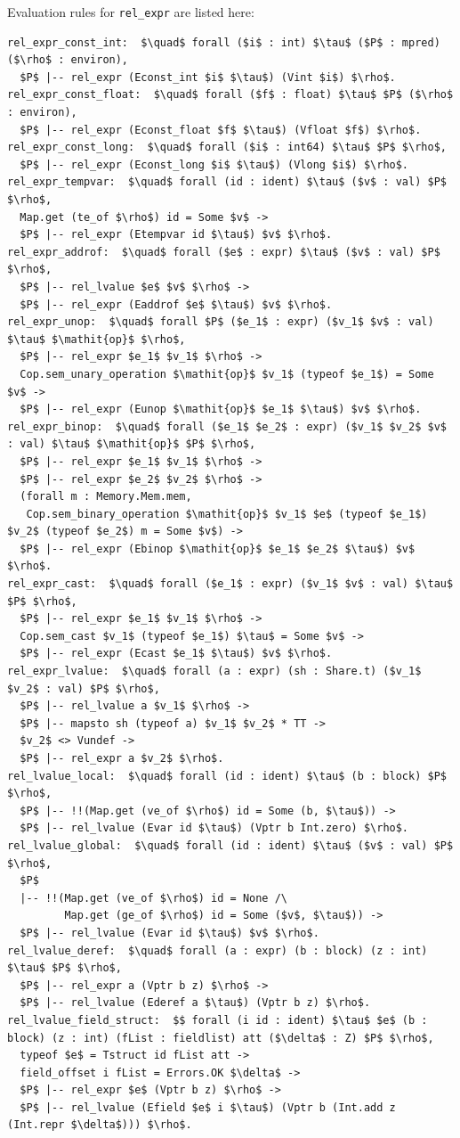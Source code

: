 \documentclass[12pt,fleqn,openany,oneside,showtrims]{memoir}
\begin{document}
Evaluation rules for \lstinline{rel_expr} are listed here:
\begin{lstlisting}
rel_expr_const_int:  $\quad$ forall ($i$ : int) $\tau$ ($P$ : mpred) ($\rho$ : environ),
  $P$ |-- rel_expr (Econst_int $i$ $\tau$) (Vint $i$) $\rho$.
rel_expr_const_float:  $\quad$ forall ($f$ : float) $\tau$ $P$ ($\rho$ : environ),
  $P$ |-- rel_expr (Econst_float $f$ $\tau$) (Vfloat $f$) $\rho$.
rel_expr_const_long:  $\quad$ forall ($i$ : int64) $\tau$ $P$ $\rho$,
  $P$ |-- rel_expr (Econst_long $i$ $\tau$) (Vlong $i$) $\rho$.
rel_expr_tempvar:  $\quad$ forall (id : ident) $\tau$ ($v$ : val) $P$ $\rho$,
  Map.get (te_of $\rho$) id = Some $v$ ->
  $P$ |-- rel_expr (Etempvar id $\tau$) $v$ $\rho$.
rel_expr_addrof:  $\quad$ forall ($e$ : expr) $\tau$ ($v$ : val) $P$ $\rho$,
  $P$ |-- rel_lvalue $e$ $v$ $\rho$ ->
  $P$ |-- rel_expr (Eaddrof $e$ $\tau$) $v$ $\rho$.
rel_expr_unop:  $\quad$ forall $P$ ($e_1$ : expr) ($v_1$ $v$ : val) $\tau$ $\mathit{op}$ $\rho$,
  $P$ |-- rel_expr $e_1$ $v_1$ $\rho$ ->
  Cop.sem_unary_operation $\mathit{op}$ $v_1$ (typeof $e_1$) = Some $v$ ->
  $P$ |-- rel_expr (Eunop $\mathit{op}$ $e_1$ $\tau$) $v$ $\rho$.
rel_expr_binop:  $\quad$ forall ($e_1$ $e_2$ : expr) ($v_1$ $v_2$ $v$ : val) $\tau$ $\mathit{op}$ $P$ $\rho$,
  $P$ |-- rel_expr $e_1$ $v_1$ $\rho$ ->
  $P$ |-- rel_expr $e_2$ $v_2$ $\rho$ ->
  (forall m : Memory.Mem.mem,
   Cop.sem_binary_operation $\mathit{op}$ $v_1$ $e$ (typeof $e_1$) $v_2$ (typeof $e_2$) m = Some $v$) ->
  $P$ |-- rel_expr (Ebinop $\mathit{op}$ $e_1$ $e_2$ $\tau$) $v$ $\rho$.
rel_expr_cast:  $\quad$ forall ($e_1$ : expr) ($v_1$ $v$ : val) $\tau$ $P$ $\rho$,
  $P$ |-- rel_expr $e_1$ $v_1$ $\rho$ ->
  Cop.sem_cast $v_1$ (typeof $e_1$) $\tau$ = Some $v$ ->
  $P$ |-- rel_expr (Ecast $e_1$ $\tau$) $v$ $\rho$.
rel_expr_lvalue:  $\quad$ forall (a : expr) (sh : Share.t) ($v_1$ $v_2$ : val) $P$ $\rho$,
  $P$ |-- rel_lvalue a $v_1$ $\rho$ ->
  $P$ |-- mapsto sh (typeof a) $v_1$ $v_2$ * TT ->
  $v_2$ <> Vundef ->
  $P$ |-- rel_expr a $v_2$ $\rho$.
rel_lvalue_local:  $\quad$ forall (id : ident) $\tau$ (b : block) $P$ $\rho$,
  $P$ |-- !!(Map.get (ve_of $\rho$) id = Some (b, $\tau$)) ->
  $P$ |-- rel_lvalue (Evar id $\tau$) (Vptr b Int.zero) $\rho$.
rel_lvalue_global:  $\quad$ forall (id : ident) $\tau$ ($v$ : val) $P$ $\rho$,
  $P$
  |-- !!(Map.get (ve_of $\rho$) id = None /\
         Map.get (ge_of $\rho$) id = Some ($v$, $\tau$)) ->
  $P$ |-- rel_lvalue (Evar id $\tau$) $v$ $\rho$.
rel_lvalue_deref:  $\quad$ forall (a : expr) (b : block) (z : int) $\tau$ $P$ $\rho$,
  $P$ |-- rel_expr a (Vptr b z) $\rho$ ->
  $P$ |-- rel_lvalue (Ederef a $\tau$) (Vptr b z) $\rho$.
rel_lvalue_field_struct:  $$ forall (i id : ident) $\tau$ $e$ (b : block) (z : int) (fList : fieldlist) att ($\delta$ : Z) $P$ $\rho$,
  typeof $e$ = Tstruct id fList att ->
  field_offset i fList = Errors.OK $\delta$ ->
  $P$ |-- rel_expr $e$ (Vptr b z) $\rho$ ->
  $P$ |-- rel_lvalue (Efield $e$ i $\tau$) (Vptr b (Int.add z (Int.repr $\delta$))) $\rho$.
\end{lstlisting}
\end{document}
